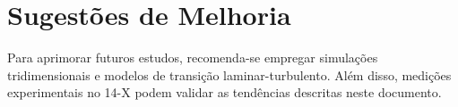 \documentclass[12pt]{article}
\begin{document}
	\section*{Sugest\~oes de Melhoria}
	
		Para aprimorar futuros estudos, recomenda-se empregar simula\c{c}\~oes tridimensionais e modelos de transi\c{c}\~ao laminar-turbulento. Al\'em disso, medi\c{c}\~oes experimentais no 14-X podem validar as tend\^encias descritas neste documento.
\end{document}
